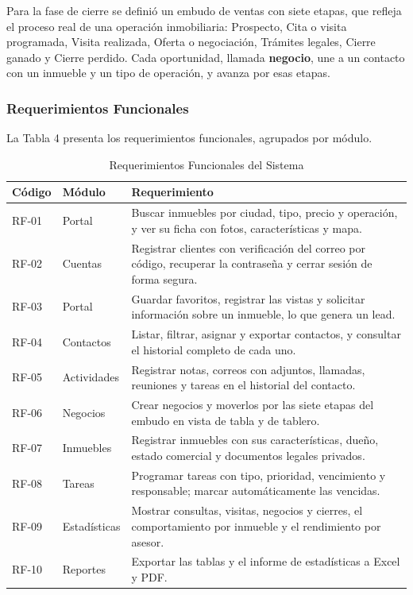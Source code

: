 \documentclass[stu,12pt,letterpaper,donotrepeattitle,floatsintext]{apa7}
\begin{document}
Para la fase de cierre se definió un embudo de ventas con siete etapas, que refleja el proceso real de una operación inmobiliaria: Prospecto, Cita o visita programada, Visita realizada, Oferta o negociación, Trámites legales, Cierre ganado y Cierre perdido. Cada oportunidad, llamada \textbf{negocio}, une a un contacto con un inmueble y un tipo de operación, y avanza por esas etapas.

\subsubsection{Requerimientos Funcionales}

La Tabla 4 presenta los requerimientos funcionales, agrupados por módulo.

\begin{table}[htbp]
\caption{Requerimientos Funcionales del Sistema}
\small
\begin{tabularx}{\linewidth}{>{\hsize}L>{\hsize}L>{\hsize}L}
\toprule
\textbf{Código} & \textbf{Módulo} & \textbf{Requerimiento} \\
\midrule
RF-01 & Portal & Buscar inmuebles por ciudad, tipo, precio y operación, y ver su ficha con fotos, características y mapa. \\
RF-02 & Cuentas & Registrar clientes con verificación del correo por código, recuperar la contraseña y cerrar sesión de forma segura. \\
RF-03 & Portal & Guardar favoritos, registrar las vistas y solicitar información sobre un inmueble, lo que genera un lead. \\
RF-04 & Contactos & Listar, filtrar, asignar y exportar contactos, y consultar el historial completo de cada uno. \\
RF-05 & Actividades & Registrar notas, correos con adjuntos, llamadas, reuniones y tareas en el historial del contacto. \\
RF-06 & Negocios & Crear negocios y moverlos por las siete etapas del embudo en vista de tabla y de tablero. \\
RF-07 & Inmuebles & Registrar inmuebles con sus características, dueño, estado comercial y documentos legales privados. \\
RF-08 & Tareas & Programar tareas con tipo, prioridad, vencimiento y responsable; marcar automáticamente las vencidas. \\
RF-09 & Estadísticas & Mostrar consultas, visitas, negocios y cierres, el comportamiento por inmueble y el rendimiento por asesor. \\
RF-10 & Reportes & Exportar las tablas y el informe de estadísticas a Excel y PDF. \\
\bottomrule
\end{tabularx}
\end{table}
\end{document}
